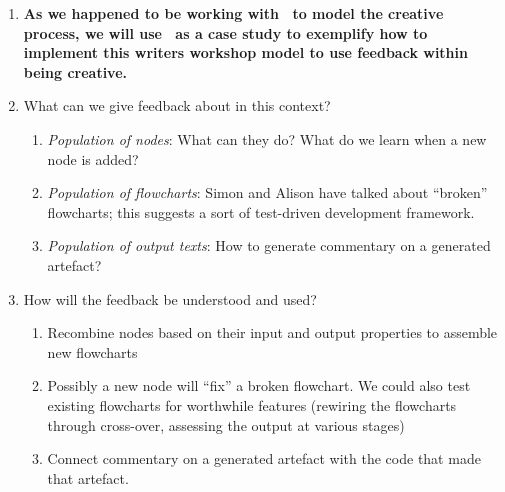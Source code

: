 \begin{enumerate}[start=3]
\item \textbf{As we happened to be working with \Fw\ to model the
  creative process, we will use \Fw\ as a case study to exemplify how
  to implement this writers workshop model to use feedback within
  being creative.}
\item[] What can we give feedback about in this context?
\begin{enumerate}
\item \emph{Population of nodes}: What can they do?  What do we learn when a
  new node is added?
\item \emph{Population of flowcharts}: Simon and Alison have talked
  about ``broken'' flowcharts; this suggests a sort of test-driven
  development framework.
\item \emph{Population of output texts}: How to generate commentary on
  a generated artefact?
\end{enumerate}
\item[] How will the feedback be understood and used?
\begin{enumerate}
\item Recombine nodes based on their input and output properties to assemble new flowcharts 
\item Possibly a new node will ``fix'' a broken flowchart.  We could also test existing flowcharts for worthwhile features (rewiring the flowcharts through cross-over, assessing the output at various stages)
\item Connect commentary on a generated artefact with the code that
  made that artefact.
\end{enumerate}
\end{enumerate}
